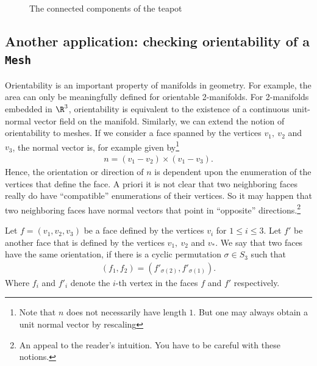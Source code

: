 \begin{ex}
\begin{figure}[H]
    \hfil
    \caption{The connected components of the teapot}
    \label{fig:teapotcomps}
\end{figure}
\end{ex}
\subsection{Another application: checking orientability of a \texttt{Mesh}}
Orientability is an important property of manifolds in geometry. For example, the area can only be meaningfully defined for orientable 2-manifolds. For 2-manifolds embedded in $\R^3$, orientability is equivalent to the existence of a continuous unit-normal vector field on the manifold. Similarly, we can extend the notion of orientability to meshes. If we consider a face spanned by the vertices $v_1,\ v_2$ and $v_3$, the normal vector is, for example given by\footnote{Note that $n$ does not necessarily have length $1$. But one may always obtain a unit normal vector by rescaling}
\begin{align*}
    n = (v_1 - v_2)\times (v_1 - v_3).
\end{align*}
Hence, the orientation or direction of $n$ is dependent upon the enumeration of the vertices that define the face. A priori it is not clear that two neighboring faces really do have ``compatible'' enumerations of their vertices. So it may happen that two neighboring faces have normal vectors that point in ``opposite'' directions.\footnote{An appeal to the reader's intuition. You have to be careful with these notions.}
\begin{defi}
    Let $f = (v_1, v_2, v_3)$ be a face defined by the vertices $v_i$ for $1\leq i\leq 3$. Let $f'$ be another face that is defined by the vertices $v_1,\ v_2$ and $v_{\ast}$. We say that two faces have the same orientation, if there is a cyclic permutation $\sigma\in S_3$ such that
    \begin{align*}
        (f_1, f_2) = (f'_{\sigma(2)},f'_{\sigma(1)}).
    \end{align*}
    Where $f_i$ and $f'_i$ denote the $i$-th vertex in the faces $f$ and $f'$ respectively.
\end{defi}
